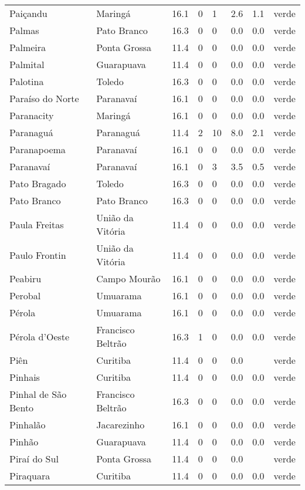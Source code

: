 \begin{longtable}{l|lllllll}
  Paiçandu & Maringá & 16.1 & 0 & 1 & 2.6 & 1.1 & verde \\ 
  Palmas & Pato Branco & 16.3 & 0 & 0 & 0.0 & 0.0 & verde \\ 
  Palmeira & Ponta Grossa & 11.4 & 0 & 0 & 0.0 & 0.0 & verde \\ 
  Palmital & Guarapuava & 11.4 & 0 & 0 & 0.0 & 0.0 & verde \\ 
  Palotina & Toledo & 16.3 & 0 & 0 & 0.0 & 0.0 & verde \\ 
  Paraíso do Norte & Paranavaí & 16.1 & 0 & 0 & 0.0 & 0.0 & verde \\ 
  Paranacity & Maringá & 16.1 & 0 & 0 & 0.0 & 0.0 & verde \\ 
  Paranaguá & Paranaguá & 11.4 & 2 & 10 & 8.0 & 2.1 & verde \\ 
  Paranapoema & Paranavaí & 16.1 & 0 & 0 & 0.0 & 0.0 & verde \\ 
  Paranavaí & Paranavaí & 16.1 & 0 & 3 & 3.5 & 0.5 & verde \\ 
  Pato Bragado & Toledo & 16.3 & 0 & 0 & 0.0 & 0.0 & verde \\ 
  Pato Branco & Pato Branco & 16.3 & 0 & 0 & 0.0 & 0.0 & verde \\ 
  Paula Freitas & União da Vitória & 11.4 & 0 & 0 & 0.0 & 0.0 & verde \\ 
  Paulo Frontin & União da Vitória & 11.4 & 0 & 0 & 0.0 & 0.0 & verde \\ 
  Peabiru & Campo Mourão & 16.1 & 0 & 0 & 0.0 & 0.0 & verde \\ 
  Perobal & Umuarama & 16.1 & 0 & 0 & 0.0 & 0.0 & verde \\ 
  Pérola & Umuarama & 16.1 & 0 & 0 & 0.0 & 0.0 & verde \\ 
  Pérola d'Oeste & Francisco Beltrão & 16.3 & 1 & 0 & 0.0 & 0.0 & verde \\ 
  Piên & Curitiba & 11.4 & 0 & 0 & 0.0 &  & verde \\ 
  Pinhais & Curitiba & 11.4 & 0 & 0 & 0.0 & 0.0 & verde \\ 
  Pinhal de São Bento & Francisco Beltrão & 16.3 & 0 & 0 & 0.0 & 0.0 & verde \\ 
  Pinhalão & Jacarezinho & 16.1 & 0 & 0 & 0.0 & 0.0 & verde \\ 
  Pinhão & Guarapuava & 11.4 & 0 & 0 & 0.0 & 0.0 & verde \\ 
  Piraí do Sul & Ponta Grossa & 11.4 & 0 & 0 & 0.0 &  & verde \\ 
  Piraquara & Curitiba & 11.4 & 0 & 0 & 0.0 & 0.0 & verde \\ 

\end{longtable}
